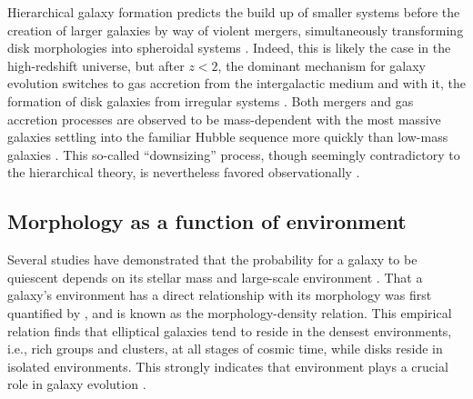 

Hierarchical galaxy formation predicts the build up of smaller systems before the creation of larger galaxies by way of violent mergers, simultaneously transforming disk morphologies into spheroidal systems \citep{Driver2013,Bluck2009,Man2012}. Indeed, this is likely the case in the high-redshift universe, but after $z<2$, the dominant mechanism for galaxy evolution switches to gas accretion from the intergalactic medium and with it, the formation of disk galaxies from irregular systems \citep{Conselice2013}. Both mergers and gas accretion processes are observed to be mass-dependent with the most massive galaxies settling into the familiar Hubble sequence more quickly than low-mass galaxies \citep{Buitrago2013,Conselice2011,Mortlock2013}. This so-called ``downsizing'' process, though seemingly contradictory to the hierarchical theory, is nevertheless favored observationally \citep{Cowie1996, Brinchmann2000, Bundy2005, Cimatti2006}. 



\subsection{Morphology as a function of environment}
\label{sec: morph and environment}

Several studies have demonstrated that the probability for a galaxy to be quiescent depends on its stellar mass and large-scale environment \citep{Balogh2004, Hogg2004, Peng2010, Woo2013}. That a galaxy's environment has a direct relationship with its morphology was first quantified by \cite{Dressler1980}, and is known as the morphology-density relation. This empirical relation finds that elliptical galaxies tend to reside in the densest environments, i.e., rich groups and clusters, at all stages of cosmic time, while disks reside in isolated environments. This strongly indicates that environment plays a crucial role in galaxy evolution \citep[e.g.,][]{Fasano2000, Smith2005, Peng2010}. 

